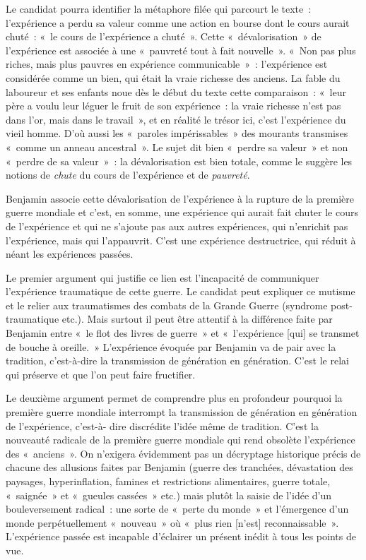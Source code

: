 {Le candidat pourra identifier la métaphore filée qui parcourt le texte~: l'expérience a perdu
sa valeur comme une action en bourse dont le cours aurait chuté~: «~le cours de l'expérience a
chuté~». Cette «~dévalorisation~» de l'expérience est associée à une «~pauvreté tout à fait
nouvelle~». «~Non pas plus riches, mais plus pauvres en expérience communicable~»~:
l'expérience est considérée comme un bien, qui était la vraie richesse des anciens. La fable du
laboureur et ses enfants noue dès le début du texte cette comparaison~: «~leur père a voulu leur
léguer le fruit de son expérience~: la vraie richesse n'est pas dans l'or, mais dans le travail~», et en réalité le trésor ici, c'est l'expérience du vieil homme. D'où aussi les «~paroles impérissables~»
des mourants transmises «~comme un anneau ancestral~». Le sujet dit bien «~perdre sa valeur~»
et non «~perdre de sa valeur~»~: la dévalorisation est bien totale, comme le suggère les notions
de \textit{chute} du cours de l'expérience et de \textit{pauvreté}.

Benjamin associe cette dévalorisation de l'expérience à la rupture de la première guerre
mondiale et c'est, en somme, une expérience qui aurait fait chuter le cours de l'expérience et qui
ne s'ajoute pas aux autres expériences, qui n'enrichit pas l'expérience, mais qui l'appauvrit. C'est
une expérience destructrice, qui réduit à néant les expériences passées.

Le premier argument qui justifie ce lien est l'incapacité de communiquer l'expérience
traumatique de cette guerre. Le candidat peut expliquer ce mutisme et le relier aux traumatismes
des combats de la Grande Guerre (syndrome post-traumatique etc.). Mais surtout il peut être
attentif à la différence faite par Benjamin entre «~le flot des livres de guerre~» et «~l'expérience
[qui] se transmet de bouche à oreille.~» L'expérience évoquée par Benjamin va de pair avec la
tradition, c'est-à-dire la transmission de génération en génération. C'est le relai qui préserve et
que l'on peut faire fructifier.

Le deuxième argument permet de comprendre plus en profondeur pourquoi la première
guerre mondiale interrompt la transmission de génération en génération de l'expérience, c'est-à-
dire discrédite l'idée même de tradition. C'est la nouveauté radicale de la première guerre
mondiale qui rend obsolète l'expérience des «~anciens~». On n'exigera évidemment pas un
décryptage historique précis de chacune des allusions faites par Benjamin (guerre des tranchées,
dévastation des paysages, hyperinflation, famines et restrictions alimentaires, guerre totale,
«~saignée~» et «~gueules cassées~» etc.) mais plutôt la saisie de l'idée d'un bouleversement
radical~: une sorte de «~perte du monde~» et l'émergence d'un monde perpétuellement
«~nouveau~» où «~plus rien [n'est] reconnaissable~». L'expérience passée est incapable d'éclairer
un présent inédit à tous les points de vue.

}
